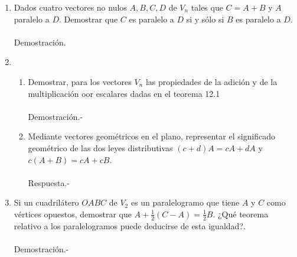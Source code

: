 \begin{enumerate}
\item Dados cuatro vectores no nulos $A,B,C,D$ de $V_n$ tales que $C=A+B$ y $A$ paralelo a $D$. Demostrar que $C$ es paralelo a $D$ si y sólo si $B$ es paralelo a $D$.\\\\
    Demostración.\; 

\item 
\begin{enumerate}[\bfseries a)]
    
    \item Demostrar, para los vectores $V_n$ las propiedades de la adición y de la multiplicación oor escalares dadas en el teorema 12.1\\\\
	Demostración.-\; 

    \item Mediante vectores geométricos en el plano, representar el significado geométrico de las dos leyes distributivas $(c+d)A=cA+dA$ y $c(A+B) = cA+cB$.\\\\
	Respuesta.-\;

\end{enumerate}

\item Si un cuadrilátero $OABC$ de $V_2$ es un paralelogramo que tiene $A$ y $C$ como vértices opuestos, demostrar que $A+\frac{1}{2}(C-A) =\frac{1}{2}B$. ¿Qué teorema relativo a los paralelogramos puede deducirse de esta igualdad?.\\\\
    Demostración.-\; 

\end{enumerate}
